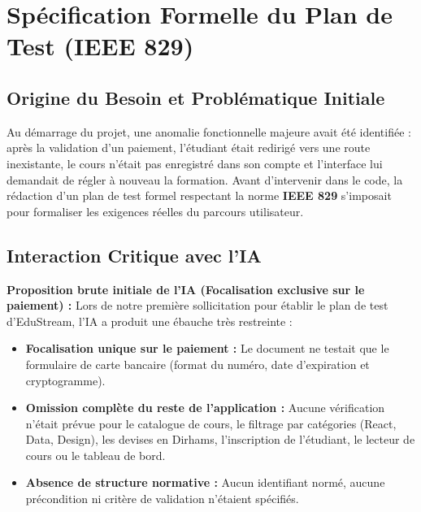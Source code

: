 \documentclass[11pt, a4paper, openany]{report}
\begin{document}
\chapter{Spécification Formelle du Plan de Test (IEEE 829)}

\section{Origine du Besoin et Problématique Initiale}
Au démarrage du projet, une anomalie fonctionnelle majeure avait été identifiée : après la validation d'un paiement, l'étudiant était redirigé vers une route inexistante, le cours n'était pas enregistré dans son compte et l'interface lui demandait de régler à nouveau la formation. Avant d'intervenir dans le code, la rédaction d'un plan de test formel respectant la norme \textbf{IEEE 829} s'imposait pour formaliser les exigences réelles du parcours utilisateur.

\section{Interaction Critique avec l'IA}

\begin{aiCritiqueBox}
\textbf{Proposition brute initiale de l'IA (Focalisation exclusive sur le paiement) :}
Lors de notre première sollicitation pour établir le plan de test d'EduStream, l'IA a produit une ébauche très restreinte :
\begin{itemize}[label=$\times$, itemsep=1pt]
    \item \textbf{Focalisation unique sur le paiement :} Le document ne testait que le formulaire de carte bancaire (format du numéro, date d'expiration et cryptogramme).
    \item \textbf{Omission complète du reste de l'application :} Aucune vérification n'était prévue pour le catalogue de cours, le filtrage par catégories (React, Data, Design), les devises en Dirhams, l'inscription de l'étudiant, le lecteur de cours ou le tableau de bord.
    \item \textbf{Absence de structure normative :} Aucun identifiant normé, aucune précondition ni critère de validation n'étaient spécifiés.
\end{itemize}
\end{aiCritiqueBox}
\end{document}
